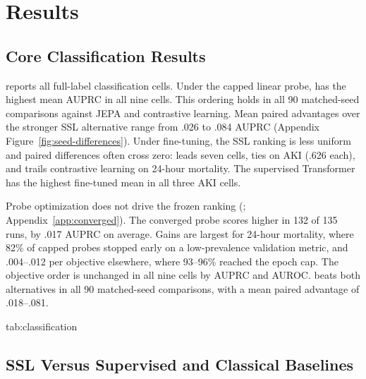 \section{Results}
\label{sec:results}

\subsection{Core Classification Results}

 reports all full-label classification cells. Under the capped linear probe, \MAE{} has the highest mean AUPRC in all nine cells. This ordering holds in all 90 matched-seed comparisons against JEPA and contrastive learning. Mean paired advantages over the stronger SSL alternative range from .026 to .084 AUPRC (Appendix Figure~\ref{fig:seed-differences}). Under fine-tuning, the SSL ranking is less uniform and paired differences often cross zero: \MAE{} leads seven cells, ties \JEPA{} on \Combined{} AKI (.626 each), and trails contrastive learning on \MIMIC{} 24-hour mortality. The supervised Transformer has the highest fine-tuned mean in all three AKI cells.

Probe optimization does not drive the frozen ranking (; Appendix~\ref{app:converged}). The converged probe scores higher in 132 of 135 runs, by .017 AUPRC on average. Gains are largest for 24-hour mortality, where 82\% of capped probes stopped early on a low-prevalence validation metric, and .004--.012 per objective elsewhere, where 93--96\% reached the epoch cap. The objective order is unchanged in all nine cells by AUPRC and AUROC. \MAE{} beats both alternatives in all 90 matched-seed comparisons, with a mean paired advantage of .018--.081.

\begin{table}[t]
\floatconts
  {tab:classification}
  {\caption{Core classification AUPRC, mean over five matched seeds. Capped probe: linear probe trained for at most 50 epochs. Converged probe: L2 logistic regression fitted to convergence on the same embeddings. Baselines are trained from scratch with full labels (Transf.: supervised Transformer). Bold marks the best mean per row within each probe block and across fine-tuning and baselines, ties at three decimals included. Appendix Tables~\ref{tab:classification-full} and~\ref{tab:converged-probe} give SDs.}}
  {\scriptsize
  }
\end{table}

\subsection{SSL Versus Supervised and Classical Baselines}

